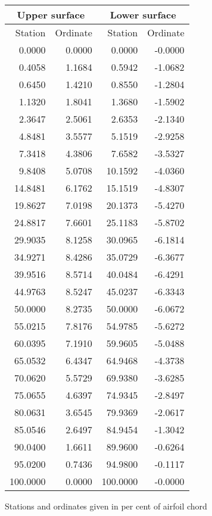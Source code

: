 \documentclass[11pt]{book}
\begin{document}
 \hspace{4mm}
 \begin{tabular}{|r|r|r|r|} \hline 
 \multicolumn{2}{|c|}{Upper surface} & \multicolumn{2}{|c|}{Lower surface} \\
 \hline
 Station & Ordinate & Station & Ordinate \\
 \hline
0.0000 & 0.0000 & 0.0000 & -0.0000 \\
0.4058 & 1.1684 & 0.5942 & -1.0682 \\
0.6450 & 1.4210 & 0.8550 & -1.2804 \\
1.1320 & 1.8041 & 1.3680 & -1.5902 \\
2.3647 & 2.5061 & 2.6353 & -2.1340 \\
4.8481 & 3.5577 & 5.1519 & -2.9258 \\
7.3418 & 4.3806 & 7.6582 & -3.5327 \\
9.8408 & 5.0708 & 10.1592 & -4.0360 \\
14.8481 & 6.1762 & 15.1519 & -4.8307 \\
19.8627 & 7.0198 & 20.1373 & -5.4270 \\
24.8817 & 7.6601 & 25.1183 & -5.8702 \\
29.9035 & 8.1258 & 30.0965 & -6.1814 \\
34.9271 & 8.4286 & 35.0729 & -6.3677 \\
39.9516 & 8.5714 & 40.0484 & -6.4291 \\
44.9763 & 8.5247 & 45.0237 & -6.3343 \\
50.0000 & 8.2735 & 50.0000 & -6.0672 \\
55.0215 & 7.8176 & 54.9785 & -5.6272 \\
60.0395 & 7.1910 & 59.9605 & -5.0488 \\
65.0532 & 6.4347 & 64.9468 & -4.3738 \\
70.0620 & 5.5729 & 69.9380 & -3.6285 \\
75.0655 & 4.6397 & 74.9345 & -2.8497 \\
80.0631 & 3.6545 & 79.9369 & -2.0617 \\
85.0546 & 2.6497 & 84.9454 & -1.3042 \\
90.0400 & 1.6611 & 89.9600 & -0.6264 \\
95.0200 & 0.7436 & 94.9800 & -0.1117 \\
100.0000 & 0.0000 & 100.0000 & -0.0000 \\
 \hline 
 \end{tabular}
 \vspace{8mm}

Stations and ordinates given in per cent of airfoil chord
\end{document}
